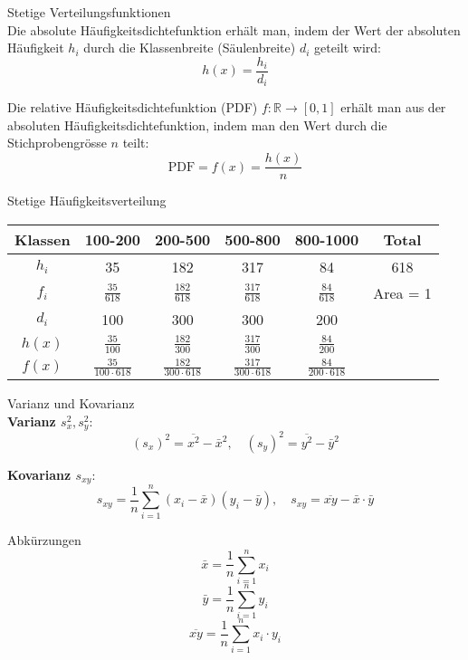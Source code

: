 \begin{definition}{Stetige Verteilungsfunktionen}\\
Die absolute Häufigkeitsdichtefunktion erhält man, indem der Wert der absoluten Häufigkeit $h_i$ durch die Klassenbreite (Säulenbreite) $d_i$ geteilt wird:
$$h(x) = \frac{h_i}{d_i}$$

Die relative Häufigkeitsdichtefunktion (PDF) $f: \mathbb{R} \rightarrow [0,1]$ erhält man aus der absoluten Häufigkeitsdichtefunktion, indem man den Wert durch die Stichprobengrösse $n$ teilt:
$$\text{PDF} = f(x) = \frac{h(x)}{n}$$

\begin{example}{Stetige Häufigkeitsverteilung}\\
\renewcommand{\arraystretch}{2}%
\begin{center}
\begin{tabular}{|c|c|c|c|c|c|}
\hline
Klassen & 100-200 & 200-500 & 500-800 & 800-1000 & Total \\
\hline
$h_i$ & 35 & 182 & 317 & 84 & 618 \\
\hline
$f_i$ & $\frac{35}{618}$ & $\frac{182}{618}$ & $\frac{317}{618}$ & $\frac{84}{618}$ & Area = 1 \\
\hline
$d_i$ & 100 & 300 & 300 & 200 & \\
\hline
$h(x)$ & $\frac{35}{100}$ & $\frac{182}{300}$ & $\frac{317}{300}$ & $\frac{84}{200}$ & \\
\hline
$f(x)$ & $\frac{35}{100 \cdot 618}$ & $\frac{182}{300 \cdot 618}$ & $\frac{317}{300 \cdot 618}$ & $\frac{84}{200 \cdot 618}$ & \\
\hline
\end{tabular}
\end{center}
\end{example}
\end{definition}

\begin{definition}{Varianz und Kovarianz}\\
\textbf{Varianz $s_x^2, s_y^2$}:
$$(s_x)^2 = \overline{x^2} - \bar{x}^2, \quad (s_y)^2 = \overline{y^2} - \bar{y}^2$$

\textbf{Kovarianz $s_{xy}$}:
$$s_{xy} = \frac{1}{n}\sum_{i=1}^{n}(x_i - \bar{x})(y_i - \bar{y}), \quad s_{xy} = \overline{xy} - \bar{x} \cdot \bar{y}$$
\end{definition}

\begin{concept}{Abkürzungen}\\
$$\bar{x} = \frac{1}{n}\sum_{i=1}^{n} x_i$$
$$\bar{y} = \frac{1}{n}\sum_{i=1}^{n} y_i$$
$$\overline{xy} = \frac{1}{n}\sum_{i=1}^{n} x_i \cdot y_i$$
\end{concept}

